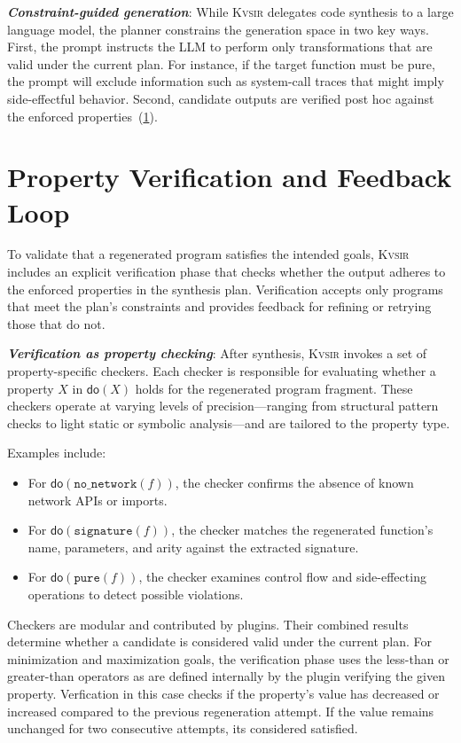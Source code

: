 \documentclass[noacm,sigplan]{acmart}
\newcommand{\sys}{{\scshape Kv{\textalpha}sir}\xspace}
\newcommand{\heading}[1]{\vspace{2pt}\noindent\textbf{\emph{#1}}:\enspace}
\begin{document}
\heading{Constraint-guided generation}
While \sys delegates code synthesis to a large language model, the planner constrains the generation space in two key ways.
First, the prompt instructs the LLM to perform only transformations that are valid under the current plan.
For instance, if the target function must be pure, the prompt will exclude information such as system-call traces that might imply side-effectful behavior.
Second, candidate outputs are verified post hoc against the enforced properties~(\cref{sec:verification}).

\section{Property Verification and Feedback Loop}
\label{sec:verification}

To validate that a regenerated program satisfies the intended goals, \sys includes an explicit verification phase that checks whether the output adheres to the enforced properties in the synthesis plan. 
Verification accepts only programs that meet the plan's constraints and provides feedback for refining or retrying those that do not.

\heading{Verification as property checking}
After synthesis, \sys invokes a set of property-specific checkers. Each checker is responsible for evaluating whether a property $X$ in $\mathsf{do}(X)$ holds for the regenerated program fragment. These checkers operate at varying levels of precision---ranging from structural pattern checks to light static or symbolic analysis---and are tailored to the property type.

Examples include:
\begin{itemize}
  \item For $\mathsf{do}(\texttt{no\_network}(f))$, the checker confirms the absence of known network APIs or imports.
  \item For $\mathsf{do}(\texttt{signature}(f))$, the checker matches the regenerated function's name, parameters, and arity against the extracted signature.
  \item For $\mathsf{do}(\texttt{pure}(f))$, the checker examines control flow and side-effecting operations to detect possible violations.
\end{itemize}

Checkers are modular and contributed by plugins. Their combined results determine whether a candidate is considered valid under the current plan.
For minimization and maximization goals, the verification phase uses the less-than or greater-than operators as are defined internally by the plugin verifying the given property.
Verfication in this case checks if the property's value has decreased or increased compared 
to the previous regeneration attempt.
If the value remains unchanged for two consecutive attempts, its considered satisfied.
\end{document}
